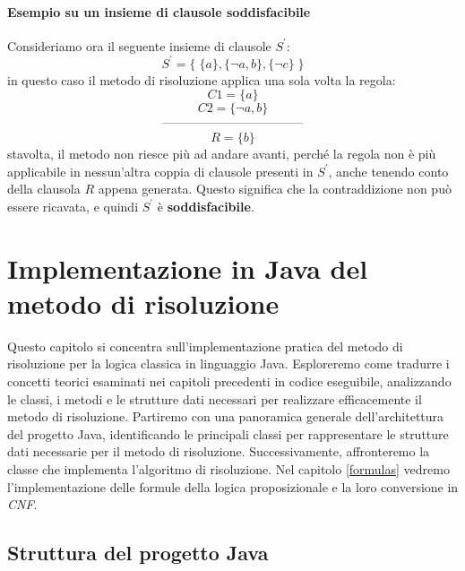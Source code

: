 \documentclass[a4paper,12pt]{report}
\begin{document}
\subsubsection{Esempio su un insieme di clausole soddisfacibile}
Consideriamo ora il seguente insieme di clausole $S^{'}$:
\[ S^{'} = \{ \; \{a\}, \{\lnot a, b\}, \{\lnot c\} \; \} \]
in questo caso il metodo di risoluzione applica una sola volta la regola:
\[ C1 = \{a\} \] \[ C2 = \{\lnot a, b\} \] \[ \rule{4cm}{0.2pt} \] \[R = \{b \}\]
stavolta, il metodo non riesce più ad andare avanti, perché la regola non è più applicabile in nessun'altra coppia di clausole presenti in $S^{'}$, anche tenendo conto della clausola $R$ appena generata. Questo significa che la contraddizione non può essere ricavata, e quindi $S^{'}$ è \textbf{soddisfacibile}.

% 
% 
\chapter{Implementazione in Java del metodo di risoluzione}
\label{impl}

Questo capitolo si concentra sull'implementazione pratica del metodo di risoluzione per la logica classica in linguaggio Java. Esploreremo come tradurre i concetti teorici esaminati nei capitoli precedenti in codice eseguibile, analizzando le classi, i metodi e le strutture dati necessari per realizzare efficacemente il metodo di risoluzione. Partiremo con una panoramica generale dell'architettura del progetto Java, identificando le principali classi per rappresentare le strutture dati necessarie per il metodo di risoluzione. Successivamente, affronteremo la classe che implementa l'algoritmo di risoluzione. Nel capitolo \ref{formulas} vedremo l'implementazione delle formule della logica proposizionale e la loro conversione in \textit{CNF}.

\section{Struttura del progetto Java}
\end{document}
